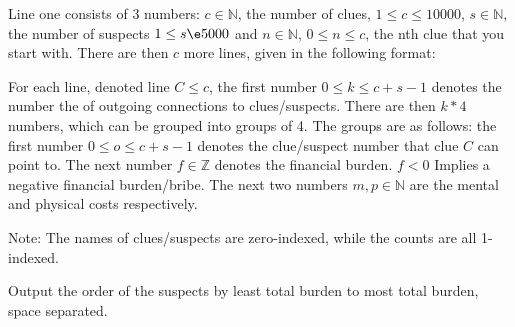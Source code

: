 \par{Line one consists of 3 numbers: $c\in\mathbb{N}$, the number of clues, $1\le c\le10000$, $s\in\mathbb{N}$, the number of suspects $1\le s\e5000$ and $n\in\mathbb{N}$, $0\le n\le c$, the nth clue that you start with. There are then $c$ more lines, given in the following format:

For each line, denoted line $C\le c$, the first number $0\le k\le c+s-1$ denotes the number the of outgoing connections to clues/suspects. There are then $k*4$ numbers, which can be grouped into groups of 4. The groups are as follows: the first number $0\le o\le c+s-1$ denotes the clue/suspect number that clue $C$ can point to. The next number $f\in\mathbb{Z}$ denotes the financial burden. $f\lt 0$ Implies a negative financial burden/bribe. The next two numbers $m, p\in\mathbb{N}$ are the mental and physical costs respectively. 

Note: The names of clues/suspects are zero-indexed, while the counts are all 1-indexed.
}

\par{Output the order of the suspects by least total burden to most total burden, space separated.}




